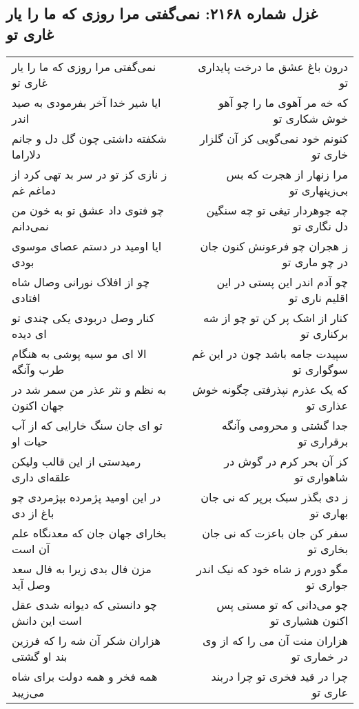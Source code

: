 \begin{center}
\section*{غزل شماره ۲۱۶۸: نمی‌گفتی مرا روزی که ما را یار غاری تو}
\label{sec:2168}
\begin{longtable}{l p{0.5cm} r}
نمی‌گفتی مرا روزی که ما را یار غاری تو
&&
درون باغ عشق ما درخت پایداری تو
\\
ایا شیر خدا آخر بفرمودی به صید اندر
&&
که خه مر آهوی ما را چو آهو خوش شکاری تو
\\
شکفته داشتی چون گل دل و جانم دلاراما
&&
کنونم خود نمی‌گویی کز آن گلزار خاری تو
\\
ز نازی کز تو در سر بد تهی کرد از دماغم غم
&&
مرا زنهار از هجرت که بس بی‌زینهاری تو
\\
چو فتوی داد عشق تو به خون من نمی‌دانم
&&
چه جوهردار تیغی تو چه سنگین دل نگاری تو
\\
ایا اومید در دستم عصای موسوی بودی
&&
ز هجران چو فرعونش کنون جان در چو ماری تو
\\
چو از افلاک نورانی وصال شاه افتادی
&&
چو آدم اندر این پستی در این اقلیم ناری تو
\\
کنار وصل دربودی یکی چندی تو ای دیده
&&
کنار از اشک پر کن تو چو از شه برکناری تو
\\
الا ای مو سیه پوشی به هنگام طرب وآنگه
&&
سپیدت جامه باشد چون در این غم سوگواری تو
\\
به نظم و نثر عذر من سمر شد در جهان اکنون
&&
که یک عذرم نپذرفتی چگونه خوش عذاری تو
\\
تو ای جان سنگ خارایی که از آب حیات او
&&
جدا گشتی و محرومی وآنگه برقراری تو
\\
رمیدستی از این قالب ولیکن علقه‌ای داری
&&
کز آن بحر کرم در گوش در شاهواری تو
\\
در این اومید پژمرده بپژمردی چو باغ از دی
&&
ز دی بگذر سبک برپر که نی جان بهاری تو
\\
بخارای جهان جان که معدنگاه علم آن است
&&
سفر کن جان باعزت که نی جان بخاری تو
\\
مزن فال بدی زیرا به فال سعد وصل آید
&&
مگو دورم ز شاه خود که نیک اندر جواری تو
\\
چو دانستی که دیوانه شدی عقل است این دانش
&&
چو می‌دانی که تو مستی پس اکنون هشیاری تو
\\
هزاران شکر آن شه را که فرزین بند او گشتی
&&
هزاران منت آن می را که از وی در خماری تو
\\
همه فخر و همه دولت برای شاه می‌زیبد
&&
چرا در قید فخری تو چرا دربند عاری تو
\\

\end{longtable}
\end{center}
